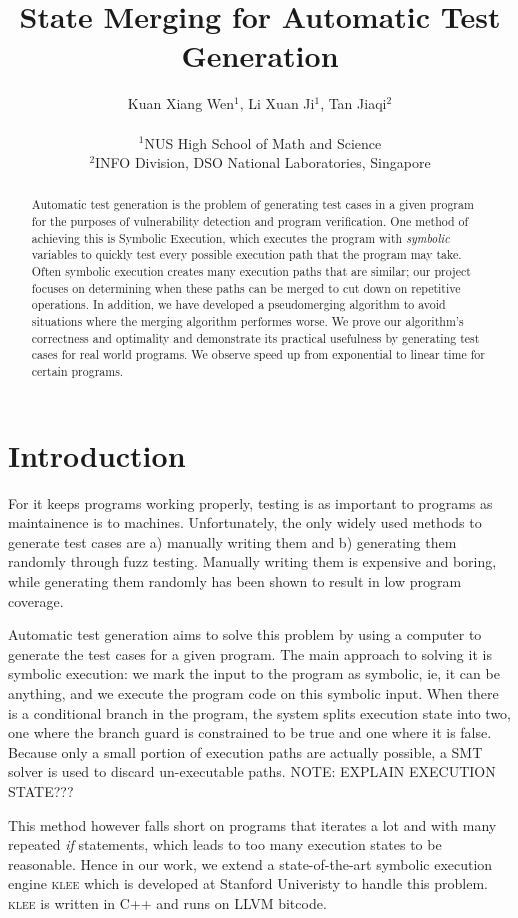 \documentclass[12pt,a4paper]{article}
\title{State Merging for Automatic Test Generation}
\date{}
\author{
Kuan Xiang Wen$^{1}$, Li Xuan Ji$^{1}$, Tan Jiaqi$^{2}$\\
\vspace{1 mm} \\
\small{$^{1}$NUS High School of Math and Science}\\
\small{$^{2}$INFO Division, DSO National Laboratories, Singapore}
}
\newcommand{\klee}{\textsc{klee }}
\begin{document}
\maketitle
\begin{abstract}
Automatic test generation is the problem of generating test cases in a given program for the purposes of vulnerability detection and program verification. One method of achieving this is Symbolic Execution, which executes the program with \emph{symbolic} variables to quickly test every possible execution path that the program may take. Often symbolic execution creates many execution paths that are similar; our project focuses on determining when these paths can be merged to cut down on repetitive operations. In addition, we have developed a pseudomerging algorithm to avoid situations where the merging algorithm performes worse. We prove our algorithm's correctness and optimality and demonstrate its practical usefulness by generating test cases for real world programs. We observe speed up from exponential to linear time for certain programs.
\end{abstract}

\section{Introduction}
For it keeps programs working properly, testing is as important to programs as maintainence is to machines. Unfortunately, the only widely used methods to generate test cases are a) manually writing them and b) generating them randomly through fuzz testing. Manually writing them is expensive and boring, while generating them randomly has been shown to result in low program coverage. 

Automatic test generation aims to solve this problem by using a computer to generate the test cases for a given program. The main approach to solving it is symbolic execution: we mark the input to the program as symbolic, ie, it can be anything, and we execute the program code on this symbolic input. When there is a conditional branch in the program, the system splits execution state into two, one where the branch guard is constrained to be true and one where it is false. Because only a small portion of execution paths are actually possible, a SMT solver is used to discard un-executable paths. NOTE: EXPLAIN EXECUTION STATE???

This method however falls short on programs that iterates a lot and with many repeated \emph{if} statements, which leads to too many execution states to be reasonable. Hence in our work, we extend a state-of-the-art symbolic execution engine \klee which is developed at Stanford Univeristy to handle this problem. \klee is written in C++ and runs on LLVM bitcode.
\end{document}
